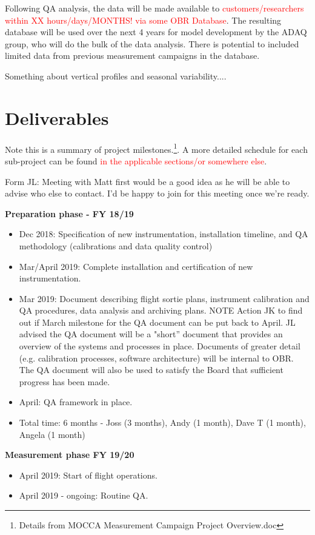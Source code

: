 \documentclass[11pt]{article} %
\begin{document}
Following QA analysis, the data will be made available to \textcolor{red}{customers/researchers within XX hours/days/MONTHS! via some OBR Database}. The resulting database will be used over the next 4 years for model development by the ADAQ group, who will do the bulk of the data analysis. There is potential to included limited data from previous measurement campaigns in the database.

Something about vertical profiles and seasonal variability....

\section{Deliverables}

Note this is a summary of project milestones.\footnote{Details from MOCCA Measurement Campaign Project Overview.doc}. A more detailed schedule for each sub-project can be found \textcolor{red}{in the applicable sections/or somewhere else}. 

Form JL: Meeting with Matt first would be a good idea as he will be able to advise who else to contact. I’d be happy to join for this meeting once we’re ready. 

\textbf{Preparation phase - FY 18/19}

\begin{itemize}
\item	Dec 2018: Specification of new instrumentation, installation timeline, and QA methodology (calibrations and data quality control)
\item 	Mar/April 2019: Complete installation and certification of new instrumentation.
\item 	Mar 2019: Document describing flight sortie plans, instrument calibration and QA procedures, data analysis and archiving plans. NOTE Action JK to find out if March milestone for the QA document can be put back to April. JL advised the QA document will be a "short” document that provides an overview of the systems and processes in place. Documents of greater detail (e.g. calibration processes, software architecture) will be internal to OBR. The QA document will also be used to satisfy the Board that sufficient progress has been made.
\item     April: QA framework in place.
\item 	Total time: 6 months - Joss (3 months), Andy (1 month), Dave T (1 month), Angela (1 month)
\end{itemize}

\textbf{Measurement phase FY 19/20}
\begin{itemize}
\item	April 2019: Start of flight operations.
\item 	April 2019 - ongoing: Routine QA.
\end{itemize}
\end{document}
